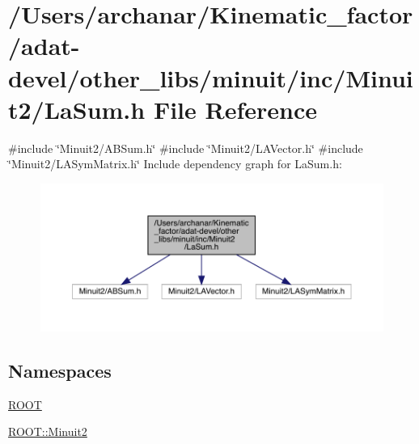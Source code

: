 \hypertarget{adat-devel_2other__libs_2minuit_2inc_2Minuit2_2LaSum_8h}{}\section{/\+Users/archanar/\+Kinematic\+\_\+factor/adat-\/devel/other\+\_\+libs/minuit/inc/\+Minuit2/\+La\+Sum.h File Reference}
\label{adat-devel_2other__libs_2minuit_2inc_2Minuit2_2LaSum_8h}
{\ttfamily \#include \char`\"{}Minuit2/\+A\+B\+Sum.\+h\char`\"{}}\newline
{\ttfamily \#include \char`\"{}Minuit2/\+L\+A\+Vector.\+h\char`\"{}}\newline
{\ttfamily \#include \char`\"{}Minuit2/\+L\+A\+Sym\+Matrix.\+h\char`\"{}}\newline
Include dependency graph for La\+Sum.\+h\+:
\nopagebreak
\begin{figure}[H]
\begin{center}
\leavevmode
\includegraphics[width=350pt]{d3/d10/adat-devel_2other__libs_2minuit_2inc_2Minuit2_2LaSum_8h__incl}
\end{center}
\end{figure}
\subsection*{Namespaces}
\begin{DoxyCompactItemize}
\item 
 \mbox{\hyperlink{namespaceROOT}{R\+O\+OT}}
\item 
 \mbox{\hyperlink{namespaceROOT_1_1Minuit2}{R\+O\+O\+T\+::\+Minuit2}}
\end{DoxyCompactItemize}
